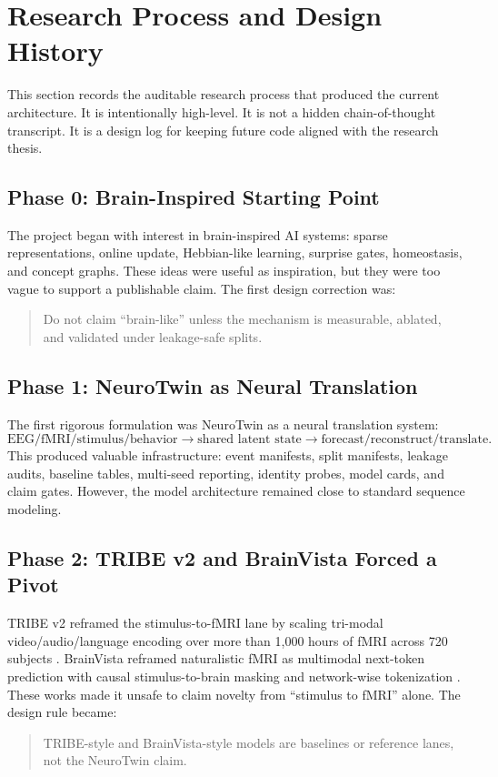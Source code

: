 \documentclass[11pt]{article}
\begin{document}
\section{Research Process and Design History}

This section records the auditable research process that produced the current architecture. It is intentionally high-level. It is not a hidden chain-of-thought transcript. It is a design log for keeping future code aligned with the research thesis.

\subsection{Phase 0: Brain-Inspired Starting Point}

The project began with interest in brain-inspired AI systems: sparse representations, online update, Hebbian-like learning, surprise gates, homeostasis, and concept graphs. These ideas were useful as inspiration, but they were too vague to support a publishable claim. The first design correction was:
\begin{quote}
Do not claim ``brain-like'' unless the mechanism is measurable, ablated, and validated under leakage-safe splits.
\end{quote}

\subsection{Phase 1: NeuroTwin as Neural Translation}

The first rigorous formulation was NeuroTwin as a neural translation system:
\begin{equation}
\text{EEG/fMRI/stimulus/behavior} \longrightarrow \text{shared latent state} \longrightarrow \text{forecast/reconstruct/translate}.
\end{equation}
This produced valuable infrastructure: event manifests, split manifests, leakage audits, baseline tables, multi-seed reporting, identity probes, model cards, and claim gates. However, the model architecture remained close to standard sequence modeling.

\subsection{Phase 2: TRIBE v2 and BrainVista Forced a Pivot}

TRIBE v2 reframed the stimulus-to-fMRI lane by scaling tri-modal video/audio/language encoding over more than 1,000 hours of fMRI across 720 subjects \cite{tribev2}. BrainVista reframed naturalistic fMRI as multimodal next-token prediction with causal stimulus-to-brain masking and network-wise tokenization \cite{brainvista}. These works made it unsafe to claim novelty from ``stimulus to fMRI'' alone. The design rule became:
\begin{quote}
TRIBE-style and BrainVista-style models are baselines or reference lanes, not the NeuroTwin claim.
\end{quote}
\end{document}
